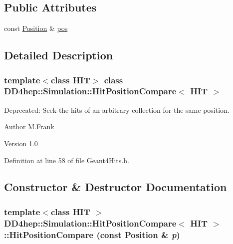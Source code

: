 \subsection*{Public Attributes}
\begin{DoxyCompactItemize}
\item 
const \hyperlink{namespace_d_d4hep_1_1_simulation_ad6fd94b3439e31d1ba4b2e640d578558}{Position} \& \hyperlink{struct_d_d4hep_1_1_simulation_1_1_hit_position_compare_a7518eb9e68d39b52d5974d90ddaad47d}{pos}
\end{DoxyCompactItemize}


\subsection{Detailed Description}
\subsubsection*{template$<$class HIT$>$ class DD4hep::Simulation::HitPositionCompare$<$ HIT $>$}

Deprecated: Seek the hits of an arbitrary collection for the same position. \begin{DoxyAuthor}{Author}
M.Frank 
\end{DoxyAuthor}
\begin{DoxyVersion}{Version}
1.0 
\end{DoxyVersion}


Definition at line 58 of file Geant4Hits.h.

\subsection{Constructor \& Destructor Documentation}
\hypertarget{struct_d_d4hep_1_1_simulation_1_1_hit_position_compare_aa1d22cc065ef2af450b0d30188f1a1a7}{
\subsubsection[{HitPositionCompare}]{\setlength{\rightskip}{0pt plus 5cm}template$<$class HIT $>$ {\bf DD4hep::Simulation::HitPositionCompare}$<$ HIT $>$::{\bf HitPositionCompare} (const {\bf Position} \& {\em p})}}
\label{struct_d_d4hep_1_1_simulation_1_1_hit_position_compare_aa1d22cc065ef2af450b0d30188f1a1a7}


